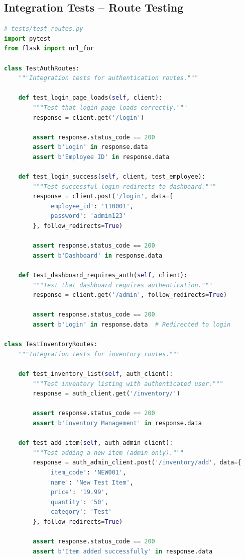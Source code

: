 \subsection{Integration Tests -- Route Testing}

\begin{lstlisting}[language=Python]
# tests/test_routes.py
import pytest
from flask import url_for

class TestAuthRoutes:
    """Integration tests for authentication routes."""
    
    def test_login_page_loads(self, client):
        """Test that login page loads correctly."""
        response = client.get('/login')
        
        assert response.status_code == 200
        assert b'Login' in response.data
        assert b'Employee ID' in response.data
    
    def test_login_success(self, client, test_employee):
        """Test successful login redirects to dashboard."""
        response = client.post('/login', data={
            'employee_id': '110001',
            'password': 'admin123'
        }, follow_redirects=True)
        
        assert response.status_code == 200
        assert b'Dashboard' in response.data
    
    def test_dashboard_requires_auth(self, client):
        """Test that dashboard requires authentication."""
        response = client.get('/admin', follow_redirects=True)
        
        assert response.status_code == 200
        assert b'Login' in response.data  # Redirected to login

class TestInventoryRoutes:
    """Integration tests for inventory routes."""
    
    def test_inventory_list(self, auth_client):
        """Test inventory listing with authenticated user."""
        response = auth_client.get('/inventory/')
        
        assert response.status_code == 200
        assert b'Inventory Management' in response.data
    
    def test_add_item(self, auth_admin_client):
        """Test adding a new item (admin only)."""
        response = auth_admin_client.post('/inventory/add', data={
            'item_code': 'NEW001',
            'name': 'New Test Item',
            'price': '19.99',
            'quantity': '50',
            'category': 'Test'
        }, follow_redirects=True)
        
        assert response.status_code == 200
        assert b'Item added successfully' in response.data
\end{lstlisting}

